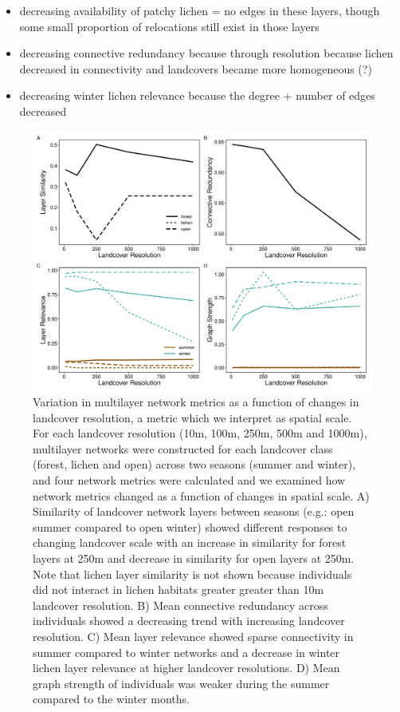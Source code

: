 \documentclass[]{article}
\providecommand{\tightlist}{%
  \setlength{\itemsep}{0pt}\setlength{\parskip}{0pt}}
\begin{document}
\begin{itemize}
\tightlist
\item
  decreasing availability of patchy lichen = no edges in these layers, though some small proportion of relocations still exist in those layers
\item
  decreasing connective redundancy because through resolution because lichen decreased in connectivity and landcovers became more homogeneous (?)
\item
  decreasing winter lichen relevance because the degree + number of edges decreased
\end{itemize}

\begin{figure}
\includegraphics[width=\linewidth]{../graphics/figure-lcres} \caption{Variation in multilayer network metrics as a function of changes in landcover resolution, a metric which we interpret as spatial scale. For each landcover resolution (10m, 100m, 250m, 500m and 1000m), multilayer networks were constructed for each landcover class (forest, lichen and open) across two seasons (summer and winter), and four network metrics were calculated and we examined how network metrics changed as a function of changes in spatial scale. A) Similarity of landcover network layers between seasons (e.g.: open summer compared to open winter) showed different responses to changing landcover scale with an increase in similarity for forest layers at 250m and decrease in similarity for open layers at 250m. Note that lichen layer similarity is not shown because individuals did not interact in lichen habitats greater greater than 10m landcover resolution. B) Mean connective redundancy across individuals showed a decreasing trend with increasing landcover resolution. C) Mean layer relevance showed sparse connectivity in summer compared to winter networks and a decrease in winter lichen layer relevance at higher landcover resolutions. D) Mean graph strength of individuals was weaker during the summer compared to the winter months.}\label{fig:unnamed-chunk-3}
\end{figure}
\end{document}
